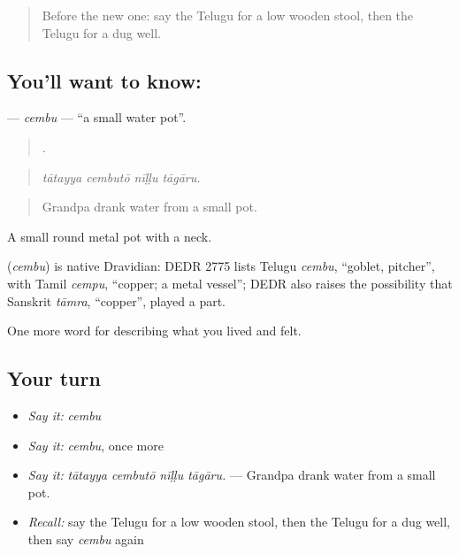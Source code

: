 \begin{quote}
Before the new one: say the Telugu for a low wooden stool, then the Telugu for a dug well.
\end{quote}

\subsection*{You'll want to know: }
\textbf{} — \emph{cembu} — \textquotedblleft{}a small water pot\textquotedblright{}.

\begin{quote}
   .
\end{quote}

\begin{quote}
\emph{tātayya cembutō nīḷḷu tāgāru.}
\end{quote}

\begin{quote}
Grandpa drank water from a small pot.
\end{quote}

A small round metal pot with a neck.

\begin{cousinweb}
\textbf{} (\emph{cembu}) is native Dravidian: DEDR 2775 lists Telugu \emph{cembu}, \textquotedblleft{}goblet, pitcher\textquotedblright{}, with Tamil \emph{cempu}, \textquotedblleft{}copper; a metal vessel\textquotedblright{}; DEDR also raises the possibility that Sanskrit \emph{tāmra}, \textquotedblleft{}copper\textquotedblright{}, played a part.
\end{cousinweb}

\begin{grammarlens}[title={What you've built}]
One more word for describing what you lived and felt.
\end{grammarlens}

\subsection*{Your turn}
\begin{itemize}
\raggedright
  \item \emph{Say it:} \emph{cembu}
  \item \emph{Say it:} \emph{cembu}, once more
  \item \emph{Say it:} \emph{tātayya cembutō nīḷḷu tāgāru.} — Grandpa drank water from a small pot.
  \item \emph{Recall:} say the Telugu for a low wooden stool, then the Telugu for a dug well, then say \emph{cembu} again
\end{itemize}

